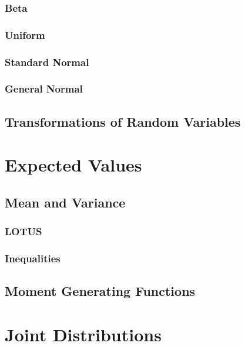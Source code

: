 \documentclass[a4paper,10pt]{article}
\begin{document}
\subsubsection{Beta}

\subsubsection{Uniform}

\subsubsection{Standard Normal}

\subsubsection{General Normal}

\subsection{Transformations of Random Variables}



\newpage
\section{Expected Values}

\subsection{Mean and Variance}
\subsubsection{LOTUS}
\subsubsection{Inequalities}

\subsection{Moment Generating Functions}



\newpage
\section{Joint Distributions}
\end{document}
